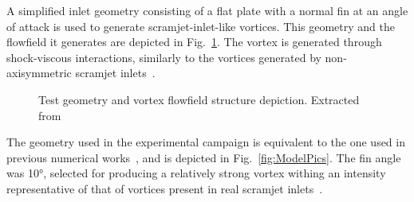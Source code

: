 \documentclass{AIAA}
\begin{document}
A simplified inlet geometry consisting of a flat plate with a normal fin at an angle of attack is used to generate scramjet-inlet-like vortices.
This geometry and the flowfield it generates are depicted in Fig.~\ref{fig:Vortex_Sketches}.
The vortex is generated through shock-viscous interactions, similarly to the vortices generated by non-axisymmetric scramjet inlets~\cite{Llobet_PlumeElongation,AFMCpaper2014}.
\begin{figure}[h]
\center
\caption{Test geometry and vortex flowfield structure depiction. Extracted from~\cite{JSASS_paper}}  
\label{fig:Vortex_Sketches}	
\end{figure}

The geometry used in the experimental campaign is equivalent to the one used in previous numerical works~\cite{SpacePlanes_paper2015,AFMCpaper2014,JSASS_paper,Llobet_PlumeElongation}, and is depicted in Fig.~\ref{fig:ModelPics}.
The fin angle was \ang{10}, selected for producing a relatively strong vortex withing an intensity representative of that of vortices present in real scramjet inlets~\cite{AFMCpaper2014,SpacePlanes_paper2015}.
\end{document}
